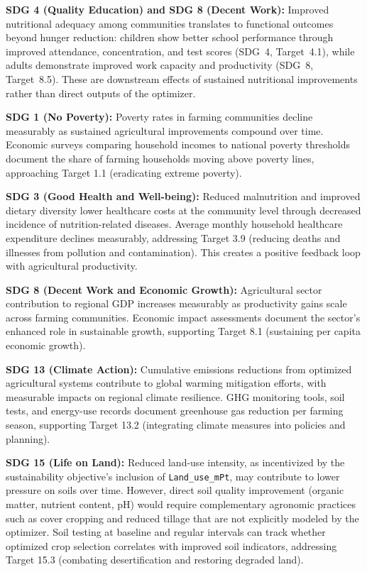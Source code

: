\documentclass{oqireport}
\begin{document}
\textbf{SDG 4 (Quality Education) and SDG 8 (Decent Work):} Improved nutritional adequacy among communities translates to functional outcomes beyond hunger reduction: children show better school performance through improved attendance, concentration, and test scores (SDG~4, Target~4.1), while adults demonstrate improved work capacity and productivity (SDG~8, Target~8.5). These are downstream effects of sustained nutritional improvements rather than direct outputs of the optimizer.

\textbf{SDG 1 (No Poverty):} Poverty rates in farming communities decline measurably as sustained agricultural improvements compound over time. Economic surveys comparing household incomes to national poverty thresholds document the share of farming households moving above poverty lines, approaching Target 1.1 (eradicating extreme poverty).

\textbf{SDG 3 (Good Health and Well-being):} Reduced malnutrition and improved dietary diversity lower healthcare costs at the community level through decreased incidence of nutrition-related diseases. Average monthly household healthcare expenditure declines measurably, addressing Target 3.9 (reducing deaths and illnesses from pollution and contamination). This creates a positive feedback loop with agricultural productivity.

\textbf{SDG 8 (Decent Work and Economic Growth):} Agricultural sector contribution to regional GDP increases measurably as productivity gains scale across farming communities. Economic impact assessments document the sector's enhanced role in sustainable growth, supporting Target 8.1 (sustaining per capita economic growth).

\textbf{SDG 13 (Climate Action):} Cumulative emissions reductions from optimized agricultural systems contribute to global warming mitigation efforts, with measurable impacts on regional climate resilience. GHG monitoring tools, soil tests, and energy-use records document greenhouse gas reduction per farming season, supporting Target 13.2 (integrating climate measures into policies and planning).

\textbf{SDG 15 (Life on Land):} Reduced land-use intensity, as incentivized by the sustainability objective's inclusion of \texttt{Land\_use\_mPt}, may contribute to lower pressure on soils over time. However, direct soil quality improvement (organic matter, nutrient content, pH) would require complementary agronomic practices such as cover cropping and reduced tillage that are not explicitly modeled by the optimizer. Soil testing at baseline and regular intervals can track whether optimized crop selection correlates with improved soil indicators, addressing Target 15.3 (combating desertification and restoring degraded land).
\end{document}
